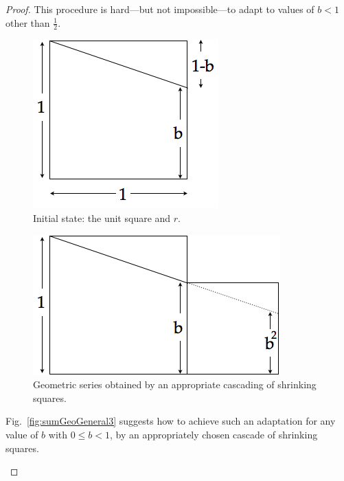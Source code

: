 \begin{proof}

This procedure is hard---but not impossible---to adapt to values of $b
<1$ other than $\frac{1}{2}$.
\begin{figure}[h]
\begin{center}
       \includegraphics[scale=0.4]{FiguresMaths/SumGeometricGeneral1}
\caption{Initial state: the unit square and $r$.}
       \label{fig:sumGeoGeneral1}
\end{center}
\end{figure}
\begin{figure}[h]
\begin{center}
       \includegraphics[scale=0.4]{FiguresMaths/SumGeometricGeneral2}
\caption{Geometric series obtained by an appropriate cascading of
  shrinking squares.}
       \label{fig:sumGeoGeneral2}
\end{center}
\end{figure}
Fig.~\ref{fig:sumGeoGeneral3} suggests how to achieve such an
adaptation for any value of $b$ with $0 \leq b <1$, by an
appropriately chosen cascade of shrinking squares.
\begin{figure}[h]

\end{figure}
\end{proof}
